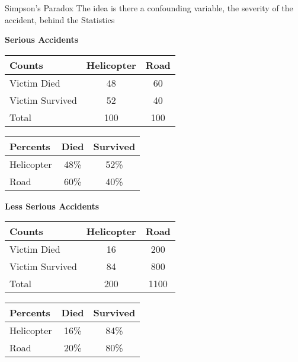\documentclass{beamer}
\begin{document}
\begin{frame}{Simpson's Paradox}
	The idea is there a confounding variable, the severity of the accident, behind the Statistics

	\begin{center}
		\textbf{Serious Accidents}
	\end{center}
	{\footnotesize
	\begin{tabular}{|l|c|c|}
		\hline
		\textbf{Counts} & \textbf{Helicopter} & \textbf{Road} \\
		\hline \hline 
		Victim Died & 48 & 60 \\ \hline 
		Victim Survived & 52 & 40 \\ \hline 
		Total & 100 & 100 \\ \hline 
	\end{tabular} 
	}
	{\footnotesize
	\begin{tabular}{|l|c|c|}
		\hline 
		\textbf{Percents} & \textbf{Died} & \textbf{Survived} \\ 
		\hline \hline
		Helicopter & 48\% & 52\% \\ \hline
		Road & 60\% & 40\% \\ \hline
	\end{tabular}
	}

	\begin{center}
		\textbf{Less Serious Accidents}
	\end{center}
	{\footnotesize
	\begin{tabular}{|l|c|c|}
		\hline
		\textbf{Counts} & \textbf{Helicopter} & \textbf{Road} \\
		\hline \hline 
		Victim Died & 16 & 200 \\ \hline 
		Victim Survived & 84 & 800 \\ \hline 
		Total & 200 & 1100 \\ \hline 
	\end{tabular} 
	}
	{\footnotesize
	\begin{tabular}{|l|c|c|}
		\hline 
		\textbf{Percents} & \textbf{Died} & \textbf{Survived} \\ 
		\hline \hline
		Helicopter & 16\% & 84\% \\ \hline
		Road & 20\% & 80\% \\ \hline
	\end{tabular}
	}

\end{frame}
\end{document}
